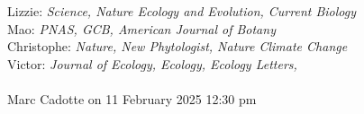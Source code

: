 \documentclass[11pt]{article}
\begin{document}
\vspace{6pt}

Lizzie: \emph{Science, Nature Ecology and Evolution, Current Biology}\\
Mao: \emph{PNAS, GCB, American Journal of Botany}\\
Christophe: \emph{Nature, New Phytologist, Nature Climate Change}\\
Victor: \emph{Journal of Ecology, Ecology, Ecology Letters,}\\


\vspace{6pt}
 \\
Marc Cadotte on 11 February 2025 12:30 pm 
\end{document}
